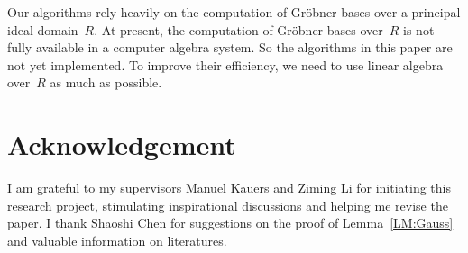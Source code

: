 \documentclass{sig-alternate}
\begin{document}
Our algorithms rely heavily on the computation of Gr\"{o}bner bases over a principal ideal domain~$R$.
At present, the computation of Gr\"{o}bner bases
over~$R$ is not fully available in a computer algebra system. So the algorithms in this paper are not yet implemented.
To improve their efficiency, we need to use linear algebra over~$R$ as much as possible.


\section{Acknowledgement}
I am grateful to my supervisors Manuel Kauers and Ziming Li for initiating this research project, stimulating inspirational discussions
and helping me revise the paper.
I thank Shaoshi Chen for suggestions on the proof of Lemma~\ref{LM:Gauss} and valuable information on literatures.
\end{document}
